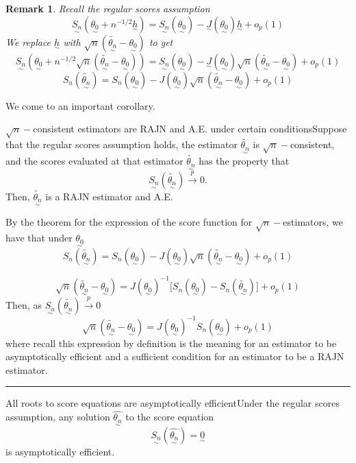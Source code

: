 \documentclass[twoside]{article}
\newtheorem{remark}[theorem]{Remark}
\newenvironment{proof}{{\bf Proof:}}{\hfill\rule{2mm}{2mm}}
\newcommand{\utilde}{\underset{\sim}}
\begin{document}
\begin{remark}Recall the regular scores assumption
$$\utilde{S_n}(\utilde{\theta_0} + n^{-1/2}\utilde{h}) = \utilde{S_n}(\utilde{\theta_0}) - \utilde{J}(\utilde{\theta_0})\utilde{h} + o_p(1)
$$
We replace $\utilde{h}$ with $\sqrt{n}(\tilde{\utilde{\theta_n}} - \utilde{\theta_0})$ to get 
$$\utilde{S_n}(\utilde{\theta_0} + n^{-1/2}\sqrt{n}(\tilde{\utilde{\theta_n}} - \utilde{\theta_0})) = \utilde{S_n}(\utilde{\theta_0}) - \utilde{J}(\utilde{\theta_0})\sqrt{n}(\tilde{\utilde{\theta_n}} - \utilde{\theta_0}) + o_p(1)
$$
$$
S_n(\tilde{\utilde{\theta_n}}) = S_n(\utilde{\theta_0}) - J(\utilde{\theta_0})\sqrt{n}(\tilde{\utilde{\theta_n}} - \utilde{\theta_0}) + o_p(1)
$$
\end{remark}

We come to an important corollary.
\begin{proposition_exam}{$\sqrt{n}-$consistent estimators are RAJN and A.E. under certain conditions}{}Suppose that the regular scores assumption holds, the estimator $\tilde{\utilde{\theta_n}}$ is $\sqrt{n}-$consistent, and the scores evaluated at that estimator $\tilde{\utilde{\theta_n}}$ has the property that
$$
\utilde{S_n}(\tilde{\utilde{\theta_n}}) \xrightarrow{p} 0.
$$
Then, $\tilde{\utilde{\theta_n}}$ is a RAJN estimator and A.E.
\end{proposition_exam}

\begin{proof} By the theorem for the expression of the score function for $\sqrt{n}-$estimators, we have that under $\utilde{\theta_0}$
$$
S_n(\tilde{\utilde{\theta_n}}) = S_n(\utilde{\theta_0}) - J(\utilde{\theta_0})\sqrt{n}(\tilde{\utilde{\theta_n}} - \utilde{\theta_0}) + o_p(1)
$$

$$
\sqrt{n}(\tilde{\utilde{\theta_n}} - \utilde{\theta_0}) = J(\utilde{\theta_0})^{-1}\bigg[S_n(\utilde{\theta_0}) - S_n(\tilde{\utilde{\theta_n}}) \bigg] + o_p(1)
$$
Then, as $\utilde{S_n}(\tilde{\utilde{\theta_n}}) \xrightarrow{p} 0$
$$
\sqrt{n}(\tilde{\utilde{\theta_n}} - \utilde{\theta_0}) = J(\utilde{\theta_0})^{-1}S_n(\utilde{\theta_0}) + o_p(1)
$$
where recall this expression by definition is the meaning for an estimator to be asymptotically efficient and a sufficient condition for an estimator to be a RAJN estimator.
\end{proof}

\begin{proposition_exam}{All roots to score equations are asymptotically efficient}{}Under the regular scores assumption, any solution $\hat{\utilde{\theta_n}}$ to the score equation 
$$
\utilde{S_n}(\hat{\utilde{\theta_n}}) = \utilde{0}
$$
is asymptotically efficient.
\end{proposition_exam}
\end{document}
